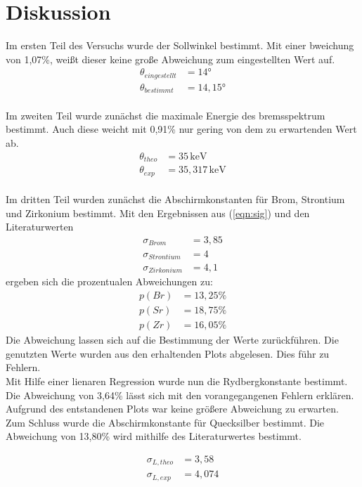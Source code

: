 \section{Diskussion}
Im ersten Teil des Versuchs wurde der Sollwinkel bestimmt.
Mit einer bweichung von 1,07\%, weißt dieser keine große Abweichung zum eingestellten Wert auf.
\begin{align*}
  \theta_{eingestellt} &= 14°\\
  \theta_{bestimmt} &= 14,15°
\end{align*}
\\
Im zweiten Teil wurde zunächst die maximale Energie des bremsspektrum bestimmt.
Auch diese weicht mit 0,91\% nur gering von dem zu erwartenden Wert ab.
\begin{align*}
  \theta_{theo} &= 35\,\mathrm{keV}\\
  \theta_{exp} &= 35,317\,\mathrm{keV}
\end{align*}
\\
Im dritten Teil wurden zunächst die Abschirmkonstanten für Brom, Strontium und Zirkonium bestimmt.
Mit den Ergebnissen aus (\ref{eqn:sig}) und den Literaturwerten
\begin{align*}
\sigma_{Brom} &= 3,85\\
\sigma_{Strontium} &= 4\\
  \sigma_{Zirkonium} &= 4,1
\end{align*}
ergeben sich die prozentualen Abweichungen zu:
\begin{align*}
p(Br) &= 13,25\%\\
p(Sr) &= 18,75\%\\
  p(Zr) &= 16,05\%
\end{align*}
Die Abweichung lassen sich auf die Bestimmung der Werte zurückführen.
Die genutzten Werte wurden aus den erhaltenden Plots abgelesen.
Dies führ zu Fehlern.\\
Mit Hilfe einer lienaren Regression wurde nun die Rydbergkonstante bestimmt.
Die Abweichung von 3,64\% lässt sich mit den vorangegangenen Fehlern erklären.
Aufgrund des entstandenen Plots war keine größere Abweichung zu erwarten.\\

Zum Schluss wurde die Abschirmkonstante für Quecksilber bestimmt.
Die Abweichung von 13,80\% wird mithilfe des Literaturwertes bestimmt. \cite{4}

\begin{align*}
\sigma_{L,theo} &= 3,58\\
  \sigma_{L,exp} &= 4,074
\end{align*}
